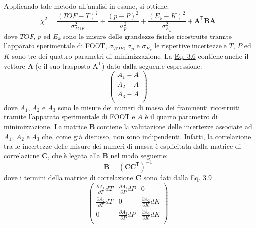 \documentclass[12pt,a4paper,twoside]{report}
\newcommand{\matr}[1]{\boldsymbol{#1}}
\newcommand{\transp}[1]{{#1}^{\mathsf{T}}}
\newcommand{\vect}[1]{\boldsymbol{#1}}
\begin{document}
	Applicando tale metodo all'analisi in esame, si ottiene:
	\begin{equation}
		\chi^2=\frac{\left(TOF-T\right)^2}{\sigma^2_{TOF}}+\frac{\left(p-P\right)^2}{\sigma^2_{p}}+\frac{\left(E_k-K\right)^2}{\sigma^2_{E_k}}+\transp{\vect{A}}\matr{B}\vect{A}
		\label{eq:chi_square}
	\end{equation}
	dove $TOF$, $p$ ed $E_k$ sono le misure delle grandezze fisiche ricostruite tramite l'apparato sperimentale di FOOT, $\sigma_{TOF}$, $\sigma_{p}$ e $\sigma_{E_k}$ le rispettive incertezze e $T$, $P$ ed $K$ sono tre dei quattro parametri di minimizzazione. La \hyperref[eq:chi_square]{Eq. 3.6} contiene anche il vettore $\vect{A}$ (e il suo trasposto $\transp{\vect{A}}$) dato dalla seguente espressione:
	\begin{equation}
		\begin{pmatrix}
			A_1-A\\
			A_2-A \\
			A_3-A\\
		\end{pmatrix}
		\label{eq:vector_A}
	\end{equation}
	dove $A_1$, $A_2$ e $A_3$ sono le misure dei numeri di massa dei frammenti ricostruiti tramite l'apparato sperimentale di FOOT e $A$ è il quarto parametro di minimizzazione. La matrice $\matr{B}$ contiene la valutazione delle incertezze associate ad $A_1$, $A_2$ e $A_3$ che, come già discusso, non sono indipendenti. Infatti, la correlazione tra le incertezze delle misure dei numeri di massa è esplicitata dalla matrice di correlazione $\matr{C}$, che è legata alla $\matr{B}$ nel modo seguente:
	\begin{equation}
		\matr{B}=\left(\matr{C}\transp{\matr{C}}\right)^{-1}
		\label{eq:B_funct_C}
	\end{equation}
	dove i termini della matrice di correlazione $\matr{C}$ sono dati dalla \hyperref[eq:correlation_matrix]{Eq. 3.9} \cite{foot_cdr,valle2019design}.
	\begin{equation}
		\begin{pmatrix}
			\frac{\partial A_1}{\partial T}dT&\frac{\partial A_1}{\partial P}dP&0\\
			\frac{\partial A_2}{\partial T}dT&0&\frac{\partial A_2}{\partial K}dK\\
			0&\frac{\partial A_3}{\partial P}dP&\frac{\partial A_3}{\partial K}dK\\
		\end{pmatrix}
		\label{eq:correlation_matrix}
	\end{equation}
\end{document}
